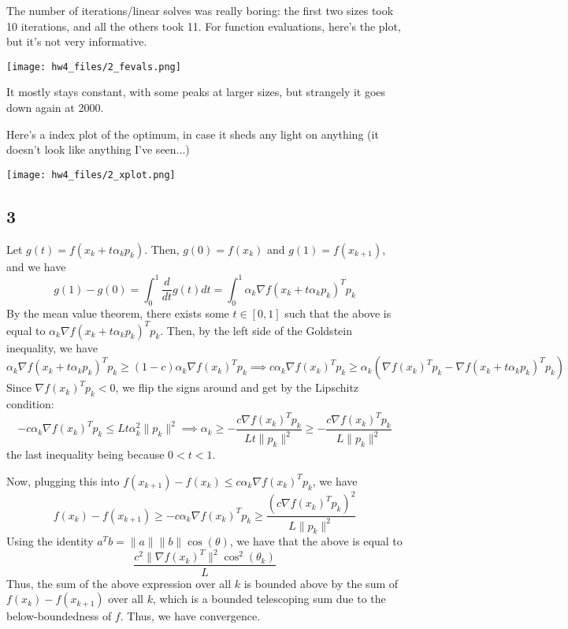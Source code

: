 \documentclass{article}
\begin{document}
The number of iterations/linear solves was really boring: the first two sizes took 10 iterations, and all the others took 11. For function evaluations, here's the plot, but it's not very informative.

\texttt{[image: hw4\_files/2\_fevals.png]}

It mostly stays constant, with some peaks at larger sizes, but strangely it goes down again at 2000. 

Here's a index plot of the optimum, in case it sheds any light on anything (it doesn't look like anything I've seen...)

\texttt{[image: hw4\_files/2\_xplot.png]}

\subsection*{3}
Let $g(t)=f(x_k+t\alpha_kp_k)$. Then, $g(0)=f(x_k)$ and $g(1)=f(x_{k+1})$, and we have 
\[g(1)-g(0)=\int_0^1\frac{d}{dt}g(t)dt=\int_0^1\alpha_k\nabla f(x_k+t\alpha_kp_k)^Tp_k\]
By the mean value theorem, there exists some $t\in[0,1]$ such that the above is equal to $\alpha_k\nabla f(x_k+t\alpha_kp_k)^Tp_k$. Then, by the left side of the Goldstein inequality, we have
\[\alpha_k\nabla f(x_k+t\alpha_kp_k)^Tp_k\geq(1-c)\alpha_k\nabla f(x_k)^Tp_k\implies c\alpha_k\nabla f(x_k)^Tp_k\geq\alpha_k(\nabla f(x_k)^Tp_k-\nabla f(x_k+t\alpha_kp_k)^Tp_k)\]
Since $\nabla f(x_k)^Tp_k<0$, we flip the signs around and get by the Lipschitz condition:
\[-c\alpha_k\nabla f(x_k)^Tp_k\leq Lt\alpha_k^2\|p_k\|^2\implies \alpha_k\geq-\frac{c\nabla f(x_k)^Tp_k}{Lt\|p_k\|^2}\geq-\frac{c\nabla f(x_k)^Tp_k}{L\|p_k\|^2}\]
the last inequality being because $0<t<1$.

Now, plugging this into $f(x_{k+1})-f(x_k)\leq c\alpha_k\nabla f(x_k)^Tp_k$, we have
\[f(x_{k})-f(x_{k+1})\geq-c\alpha_k\nabla f(x_k)^Tp_k\geq\frac{(c\nabla f(x_k)^Tp_k)^2}{L\|p_k\|^2}\]
Using the identity $a^Tb=\|a\|\|b\|\cos(\theta)$, we have that the above is equal to 
\[\frac{c^2\|\nabla f(x_k)^T\|^2\cos^2(\theta_k)}{L}\]
Thus, the sum of the above expression over all $k$ is bounded above by the sum of $f(x_k)-f(x_{k+1})$ over all $k$, which is a bounded telescoping sum due to the below-boundedness of $f$. Thus, we have convergence.
\end{document}

